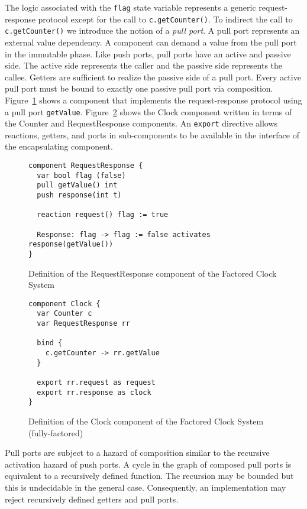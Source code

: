 The logic associated with the \verb+flag+ state variable represents a generic request-response protocol except for the call to \verb+c.getCounter()+.
To indirect the call to \verb+c.getCounter()+ we introduce the notion of a \emph{pull port}.
A pull port represents an external value dependency.
A component can demand a value from the pull port in the immutable phase.
Like push ports, pull ports have an active and passive side.
The active side represents the caller and the passive side represents the callee.
Getters are sufficient to realize the passive side of a pull port.
Every active pull port must be bound to exactly one passive pull port via composition.
Figure~\ref{request_response_component} shows a component that implements the request-response protocol using a pull port \verb+getValue+.
Figure~\ref{factored2_clock_component} shows the Clock component written in terms of the Counter and RequestResponse components.
An \verb+export+ directive allows reactions, getters, and ports in sub-components to be available in the interface of the encapsulating component.

\begin{figure}
\begin{verbatim}
component RequestResponse {
  var bool flag (false)
  pull getValue() int
  push response(int t)

  reaction request() flag := true

  Response: flag -> flag := false activates response(getValue())
}
\end{verbatim}
\caption{Definition of the RequestResponse component of the Factored Clock System}
\label{request_response_component}
\end{figure}

\begin{figure}
\begin{verbatim}
component Clock {
  var Counter c
  var RequestResponse rr

  bind {
    c.getCounter -> rr.getValue
  }

  export rr.request as request
  export rr.response as clock
}
\end{verbatim}
\caption{Definition of the Clock component of the Factored Clock System (fully-factored)}
\label{factored2_clock_component}
\end{figure}

Pull ports are subject to a hazard of composition similar to the recursive activation hazard of push ports.
A cycle in the graph of composed pull ports is equivalent to a recursively defined function.
The recursion may be bounded but this is undecidable in the general case.
Consequently, an implementation may reject recursively defined getters and pull ports.

